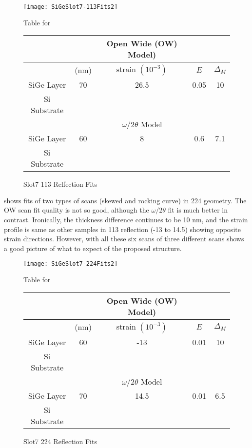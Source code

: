 \begin{figure}[hc]%
\caption{Slot7 113 Relfection Fits}
\label{Slot7-113}
\begin{minipage}{0.85\linewidth}
\texttt{[image: SiGeSlot7-113Fits2]}
\end{minipage}
\begin{minipage}{\linewidth}
\centering
\vspace{10pt}
Table for \\
\vspace{5pt}
\begin{tabular}{c|cccc}
			& 	&Open Wide (OW) Model)	 \\
\hline
			&	(nm)	&	strain	 $(10^{-3})$&	$E$ &  $\Delta_M$\\
\hline
SiGe Layer		&  	70	&      26.5	 & 0.05& 10	\\
Si Substrate		&	\textemdash & \textemdash&\textemdash\ &\textemdash	\\
\hline
			& &$\omega/2\theta$ Model \\
\hline
SiGe Layer		&	60	& 8	& 0.6	& 7.1	\\
Si Substrate		&	\textemdash & \textemdash&\textemdash\ &\textemdash
\end{tabular}
\end{minipage}
\end{figure}

 shows fits of two types of scans (skewed and rocking curve) in 224 geometry.  The OW scan fit quality is not so good, although the $\omega/2\theta$ fit is much better in contrast.  Ironically,  the thickness difference continues to be 10 nm, and the strain profile is same as other samples in 113 reflection (-13 to 14.5) showing opposite strain directions.  However, with all these six scans of three different scans shows a good picture of what to expect of the proposed structure.

\begin{figure}[hc]%
\caption{Slot7 224 Reflection Fits}
\label{Slot7-224}
\begin{minipage}{0.85\linewidth}
\texttt{[image: SiGeSlot7-224Fits2]}
\end{minipage}
\begin{minipage}{\linewidth}
\centering
\vspace{10pt}
Table for \\
\vspace{5pt}
\begin{tabular}{c|cccc}
			& 	&Open Wide (OW) Model)	 \\
\hline
			&	(nm)	&	strain	 $(10^{-3})$&	$E$ &  $\Delta_M$\\
\hline
SiGe Layer		&  	60	&      -13	 & 0.01 & 10	\\
Si Substrate		&	\textemdash & \textemdash&\textemdash\ &\textemdash	\\
\hline
			& &$\omega/2\theta$ Model \\
\hline
SiGe Layer		&	70	& 14.5	&0.01	&6.5	\\
Si Substrate		&	\textemdash & \textemdash&\textemdash\ &\textemdash
\end{tabular}
\end{minipage}
\end{figure}

